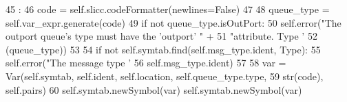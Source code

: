 \begin{DoxyCode}
45                       :
46         code = self.slicc.codeFormatter(newlines=False)
47 
48         queue_type = self.var_expr.generate(code)
49         if not queue_type.isOutPort:
50             self.error("The outport queue's type must have the 'outport' " +
51                        "attribute.  Type '%
52                        (queue_type))
53 
54         if not self.symtab.find(self.msg_type.ident, Type):
55             self.error("The message type '%
56                        self.msg_type.ident)
57 
58         var = Var(self.symtab, self.ident, self.location, self.queue_type.type,
59                   str(code), self.pairs)
60         self.symtab.newSymbol(var)
        self.symtab.newSymbol(var)
\end{DoxyCode}


